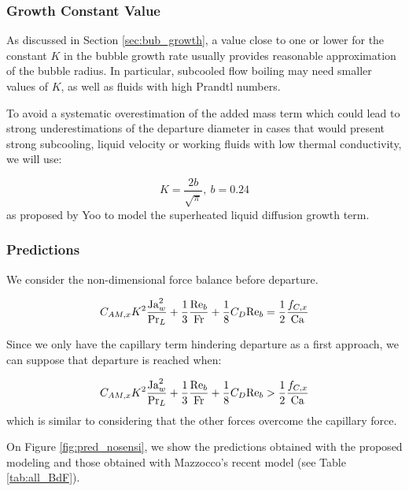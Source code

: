 \subsubsection{Growth Constant Value}

As discussed in Section \ref{sec:bub_growth}, a value close to one or lower for the constant $K$ in the bubble growth rate usually provides reasonable approximation of the bubble radius. In particular, subcooled flow boiling may need smaller values of $K$, as well as fluids with high Prandtl numbers. 

\npar

To avoid a systematic overestimation of the added mass term which could lead to strong underestimations of the departure diameter in cases that would present strong subcooling, liquid velocity or working fluids with low thermal conductivity, we will use:

\begin{equation}
K=\frac{2b}{\sqrt{\pi}},\ b=0.24
\end{equation}
as proposed by Yoo \etal \cite{yoo_development_2018} to model the superheated liquid diffusion growth term.


\subsubsection{Predictions}

We consider the non-dimensional force balance before departure.

\begin{equation}
C_{AM,x}K^{2} \frac{\mathrm{Ja}_{w}^{2}}{\mathrm{Pr}_{L}} + \frac{1}{3}\frac{\mathrm{Re}_{b}}{\mathrm{Fr}} + \frac{1}{8}C_{D}\mathrm{Re}_{b} = \frac{1}{2} \frac{f_{C,x}}{\mathrm{Ca}}
\end{equation}

Since we only have the capillary term hindering departure as a first approach, we can suppose that departure is reached when:

\begin{equation}
C_{AM,x}K^{2} \frac{\mathrm{Ja}_{w}^{2}}{\mathrm{Pr}_{L}} + \frac{1}{3}\frac{\mathrm{Re}_{b}}{\mathrm{Fr}} + \frac{1}{8}C_{D}\mathrm{Re}_{b} > \frac{1}{2} \frac{f_{C,x}}{\mathrm{Ca}}
\label{eq:pred_nogr}
\end{equation}
which is similar to considering that the other forces overcome the capillary force.


\npar
On Figure \ref{fig:pred_nosensi}, we show the predictions obtained with the proposed modeling and those obtained with Mazzocco's recent model \cite{mazzocco_reassessed_2018} (see Table \ref{tab:all_BdF}). 


